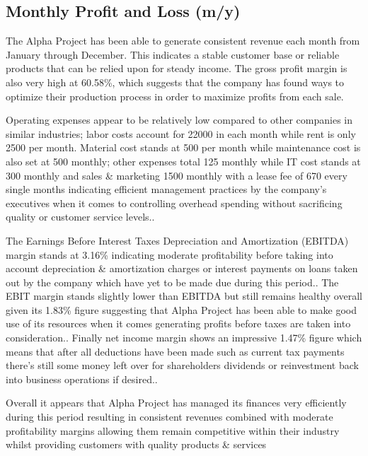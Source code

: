 

\subsection{Monthly Profit and Loss (m/y)}\label{sec:title}


The Alpha Project has been able to generate consistent revenue each month from January through December. This indicates a stable customer base or reliable products that can be relied upon for steady income. The gross profit margin is also very high at 60.58\%, which suggests that the company has found ways to optimize their production process in order to maximize profits from each sale. 

Operating expenses appear to be relatively low compared to other companies in similar industries; labor costs account for 22000 in each month while rent is only 2500 per month. Material cost stands at 500 per month while maintenance cost is also set at 500 monthly; other expenses total 125 monthly while IT cost stands at 300 monthly and sales & marketing 1500 monthly with a lease fee of 670 every single months indicating efficient management practices by the company's executives when it comes to controlling overhead spending without sacrificing quality or customer service levels.. 

The Earnings Before Interest Taxes Depreciation and Amortization (EBITDA) margin stands at 3.16\% indicating moderate profitability before taking into account depreciation & amortization charges or interest payments on loans taken out by the company which have yet to be made due during this period.. The EBIT margin stands slightly lower than EBITDA but still remains healthy overall given its 1.83\% figure suggesting that Alpha Project has been able to make good use of its resources when it comes generating profits before taxes are taken into consideration.. Finally net income margin shows an impressive 1.47\% figure which means that after all deductions have been made such as current tax payments there's still some money left over for shareholders dividends or reinvestment back into business operations if desired.. 

Overall it appears that Alpha Project has managed its finances very efficiently during this period resulting in consistent revenues combined with moderate profitability margins allowing them remain competitive within their industry whilst providing customers with quality products & services